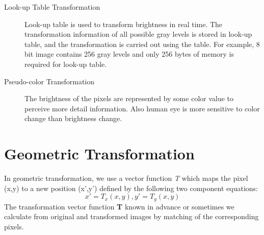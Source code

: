 \begin{description}


\item[Look-up Table Transformation]
Look-up table is used to transform brightness in real time. The transformation information of all possible gray levels is stored in look-up table, and the transformation is carried out using the table. For example, 8 bit image contains 256 gray levels and only 256 bytes of memory is required for look-up table. 
\item[Pseudo-color Transformation]
The brightness of the pixels are represented by some color value to perceive more detail information. Also human eye is more sensitive to color change than brightness change. 
\end{description}

\section{Geometric Transformation}
In geometric transformation, we use a vector function \emph{T} which maps the pixel (x,y) to a new position (x',y') defined by the following two component equations:
\begin{equation}
x'=T_x(x,y), y'=T_y(x,y)
\label{eq:geom-trans}
\end{equation}
The transformation vector function \textbf{T} known in advance or sometimes we calculate from original and transformed images by matching of the corresponding pixels. 

